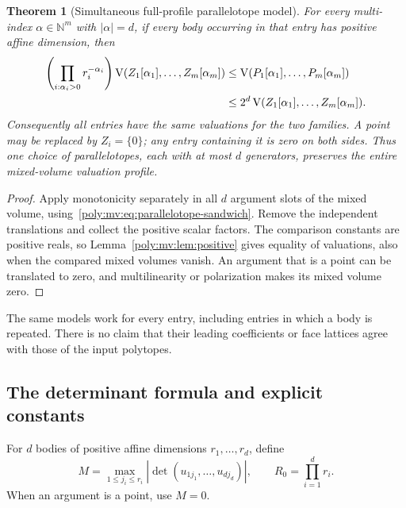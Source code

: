 \documentclass[11pt,a4paper]{article}
\numberwithin{equation}{section}
\newtheorem{theorem}{Theorem}[section]
\theoremstyle{plain}
\newcommand{\N}{\mathbb N}
\newcommand{\MV}{\operatorname{V}}
\begin{document}
\begin{theorem}[Simultaneous full-profile parallelotope model]
\label{poly:mv:thm:parallelotope-profile}
For every multi-index $\alpha\in\N^m$ with $|\alpha|=d$, if every body
occurring in that entry has positive affine dimension, then
\begin{align}
 \left(\prod_{i:\alpha_i>0}r_i^{-\alpha_i}\right)
  \MV(Z_1[\alpha_1],\ldots,Z_m[\alpha_m])
 &\le \MV(P_1[\alpha_1],\ldots,P_m[\alpha_m])\notag\\
 &\le 2^d\MV(Z_1[\alpha_1],\ldots,Z_m[\alpha_m]).
 \label{poly:mv:eq:profile-sandwich}
\end{align}
Consequently all entries have the same valuations for the two families.
A point may be replaced by $Z_i=\{0\}$; any entry containing it is zero
on both sides. Thus one choice of parallelotopes, each with at most $d$
generators, preserves the entire mixed-volume valuation profile.
\end{theorem}
\begin{proof}
Apply monotonicity separately in all $d$ argument slots of the mixed
volume, using~\eqref{poly:mv:eq:parallelotope-sandwich}. Remove the independent
translations and collect the positive scalar factors. The comparison
constants are positive reals, so Lemma~\ref{poly:mv:lem:positive} gives equality
of valuations, also when the compared mixed volumes vanish. An argument
that is a point can be translated to zero, and multilinearity or
polarization makes its mixed volume zero.
\end{proof}

The same models work for every entry, including entries in which a body
is repeated. There is no claim that their leading coefficients or face
lattices agree with those of the input polytopes.

\subsection{The determinant formula and explicit constants}
For $d$ bodies of positive affine dimensions $r_1,\ldots,r_d$, define
\begin{equation}
\label{poly:mv:eq:maxdet}
 M=\max_{1\le j_i\le r_i}
       |\det(u_{1j_1},\ldots,u_{dj_d})|,
 \qquad R_0=\prod_{i=1}^d r_i.
\end{equation}
When an argument is a point, use $M=0$.
\end{document}
